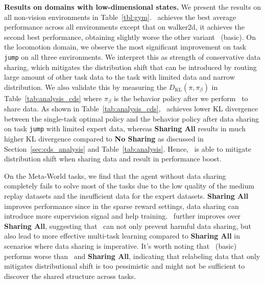 \textbf{Results on domains with low-dimensional states.} We present the results on all non-vision environments in Table~\ref{tbl:gym}.
\cdsmethodname\ achieves the 
best average performance across all environments except that on walker2d, it achieves the second best performance, obtaining slightly worse the other variant \cdsmethodname\ (basic). On the locomotion domain, we observe the most 
significant improvement on task \texttt{jump} on all three environments. We interpret this as strength of conservative data sharing, which mitigates the distribution shift that can be introduced by routing large amount of other task data to the task with limited data and narrow distribution. We also validate this by measuring the $D_\text{KL}(\pi, \pi_\beta)$ in Table~\ref{tab:analysis_cds} where $\pi_\beta$ is the behavior policy after we perform \cdsmethodname\
to share data. As shown in Table~\ref{tab:analysis_cds}, \cdsmethodname\ achieves lower KL divergence
 between the single-task optimal policy and the behavior policy after data sharing on task \texttt{jump} with limited expert data, whereas \textbf{Sharing All} results in much higher KL divergence compared to \textbf{No Sharing} as discussed in Section~\ref{sec:cds_analysis} and Table~\ref{tab:analysis}. Hence, \cdsmethodname\ is able to mitigate distribution shift when sharing data and result in performance boost.


On the Meta-World tasks, we find that the agent without data sharing completely fails to solve most of the tasks due to the low quality of the medium replay datasets and the insufficient data for the expert datasets. \textbf{Sharing All} improves performance since in the sparse reward settings, data sharing can introduce more supervision signal and help training. \cdsmethodname\ further improves over \textbf{Sharing All}, suggesting that \cdsmethodname\ can not only prevent harmful data sharing, but also lead to more effective multi-task learning compared to \textbf{Sharing All} in scenarios where data sharing is imperative. It's worth noting that \cdsmethodname\ (basic) performs worse than \cdsmethodname\ and \textbf{Sharing All}, indicating that relabeling data that only mitigates distributional shift is too pessimistic and might not be sufficient to discover the shared structure across tasks.

